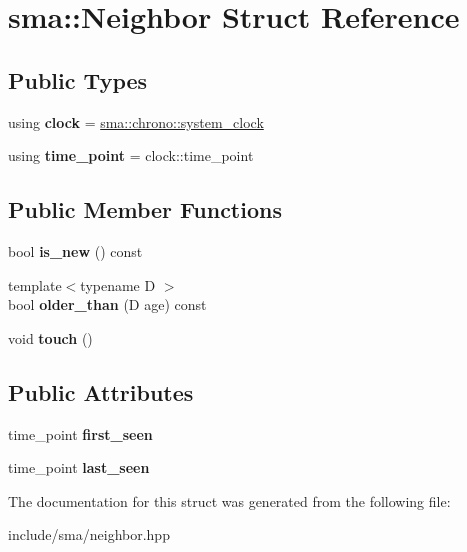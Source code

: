 \hypertarget{structsma_1_1Neighbor}{\section{sma\-:\-:Neighbor Struct Reference}
\label{structsma_1_1Neighbor}
}
\subsection*{Public Types}
\begin{DoxyCompactItemize}
\item 
\hypertarget{structsma_1_1Neighbor_a0ccc8da7cad8ef5bfb7e4f3f0e7ec49f}{using {\bfseries clock} = \hyperlink{structsma_1_1chrono_1_1system__clock}{sma\-::chrono\-::system\-\_\-clock}}\label{structsma_1_1Neighbor_a0ccc8da7cad8ef5bfb7e4f3f0e7ec49f}

\item 
\hypertarget{structsma_1_1Neighbor_a98d826a60714532d4fb24b70dd698520}{using {\bfseries time\-\_\-point} = clock\-::time\-\_\-point}\label{structsma_1_1Neighbor_a98d826a60714532d4fb24b70dd698520}

\end{DoxyCompactItemize}
\subsection*{Public Member Functions}
\begin{DoxyCompactItemize}
\item 
\hypertarget{structsma_1_1Neighbor_af35fd2a83e83e026b813f1dfd7eac92e}{bool {\bfseries is\-\_\-new} () const }\label{structsma_1_1Neighbor_af35fd2a83e83e026b813f1dfd7eac92e}

\item 
\hypertarget{structsma_1_1Neighbor_a72f897f9f70a92c877859f58d2c4f86c}{{\footnotesize template$<$typename D $>$ }\\bool {\bfseries older\-\_\-than} (D age) const }\label{structsma_1_1Neighbor_a72f897f9f70a92c877859f58d2c4f86c}

\item 
\hypertarget{structsma_1_1Neighbor_a239b8183ca0a2b9e1c78cdae730c1ced}{void {\bfseries touch} ()}\label{structsma_1_1Neighbor_a239b8183ca0a2b9e1c78cdae730c1ced}

\end{DoxyCompactItemize}
\subsection*{Public Attributes}
\begin{DoxyCompactItemize}
\item 
\hypertarget{structsma_1_1Neighbor_a480c12dade1086301c11e30a2fd07f45}{time\-\_\-point {\bfseries first\-\_\-seen}}\label{structsma_1_1Neighbor_a480c12dade1086301c11e30a2fd07f45}

\item 
\hypertarget{structsma_1_1Neighbor_a0fe58aa478b0b11e5d20cba65b04fc9d}{time\-\_\-point {\bfseries last\-\_\-seen}}\label{structsma_1_1Neighbor_a0fe58aa478b0b11e5d20cba65b04fc9d}

\end{DoxyCompactItemize}


The documentation for this struct was generated from the following file\-:\begin{DoxyCompactItemize}
\item 
include/sma/neighbor.\-hpp\end{DoxyCompactItemize}
